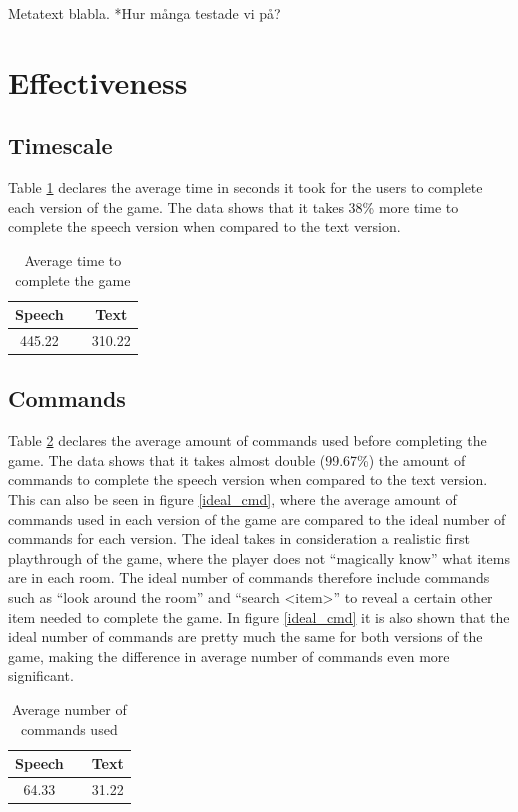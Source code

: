 Metatext blabla.
*Hur många testade vi på?

\section{Effectiveness}

\subsection{Timescale} %
Table \ref{avg_time} declares the average time in seconds it took for the users to complete each version of the game. The data shows that it takes 38\% more time to complete the speech version when compared to the text version.

\begin{table}[ht]
  \centering
  \begin{tabular}{ccc}
    \toprule
    Speech &   & Text\\
    \midrule
    445.22 &   & 310.22\\
    \bottomrule
  \end{tabular}
  \caption{Average time to complete the game}\label{avg_time}
\end{table}

\subsection{Commands} %
Table \ref{avg_cmd} declares the average amount of commands used before completing the game. The data shows that it takes almost double (99.67\%) the amount of commands to complete the speech version when compared to the text version. This can also be seen in figure \ref{ideal_cmd}, where the average amount of commands used in each version of the game are compared to the ideal number of commands for each version. The ideal takes in consideration a realistic first playthrough of the game, where the player does not ``magically know'' what items are in each room. The ideal number of commands therefore include commands such as ``look around the room'' and ``search <item>'' to reveal a certain other item needed to complete the game. In figure \ref{ideal_cmd} it is also shown that the ideal number of commands are pretty much the same for both versions of the game, making the difference in average number of commands even more significant.

\begin{table}[ht]
  \centering
  \begin{tabular}{ccc}
    \toprule
    Speech &   & Text\\
    \midrule
    64.33 &   & 31.22\\
    \bottomrule
  \end{tabular}
  \caption{Average number of commands used}\label{avg_cmd} %
\end{table}


